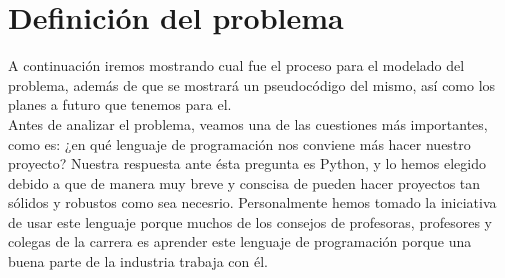 \documentclass[letterpaper]{article}
\begin{document}
\section{Definición del problema}
A continuación iremos mostrando cual fue el proceso para el modelado del problema, además de que se mostrará un pseudocódigo del mismo, así como los planes a futuro que tenemos para el.\\
Antes de analizar el problema, veamos una de las cuestiones más importantes, como es: ¿en qué lenguaje de programación nos conviene más hacer nuestro proyecto? Nuestra respuesta ante ésta pregunta es Python, y lo hemos elegido debido a que de manera muy breve y conscisa de pueden hacer proyectos tan sólidos y robustos como sea necesrio. Personalmente hemos tomado la iniciativa de usar este lenguaje porque muchos de los consejos de profesoras, profesores y colegas de la carrera es aprender este lenguaje de programación porque una buena parte de la industria trabaja con él.
\end{document}
